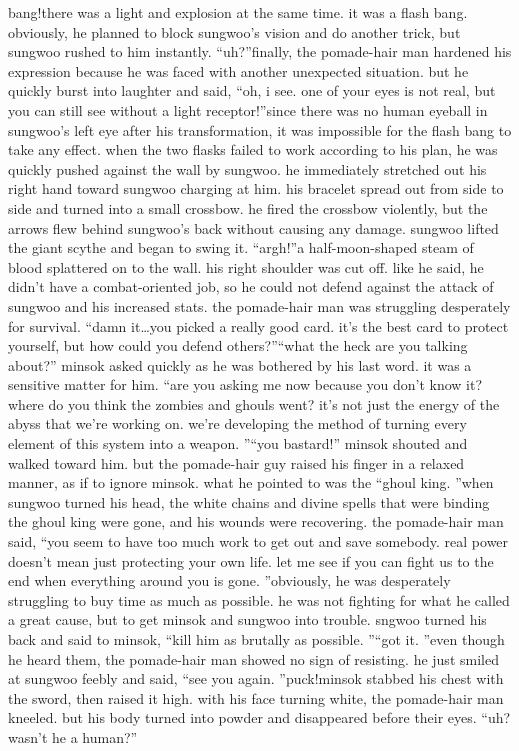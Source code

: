 bang!there was a light and explosion at the same time.
 it was a flash bang.
 obviously, he planned to block sungwoo’s vision and do another trick, but sungwoo rushed to him instantly.
“uh?”finally, the pomade-hair man hardened his expression because he was faced with another unexpected situation.
 but he quickly burst into laughter and said, “oh, i see.
 one of your eyes is not real, but you can still see without a light receptor!”since there was no human eyeball in sungwoo’s left eye after his transformation, it was impossible for the flash bang to take any effect.
when the two flasks failed to work according to his plan, he was quickly pushed against the wall by sungwoo.
 he immediately stretched out his right hand toward sungwoo charging at him.
 his bracelet spread out from side to side and turned into a small crossbow.
 he fired the crossbow violently, but the arrows flew behind sungwoo’s back without causing any damage.
 sungwoo lifted the giant scythe and began to swing it.
“argh!”a half-moon-shaped steam of blood splattered on to the wall.
 his right shoulder was cut off.
like he said, he didn’t have a combat-oriented job, so he could not defend against the attack of sungwoo and his increased stats.
 the pomade-hair man was struggling desperately for survival.
“damn it…you picked a really good card.
 it’s the best card to protect yourself, but how could you defend others?”“what the heck are you talking about?” minsok asked quickly as he was bothered by his last word.
 it was a sensitive matter for him.
“are you asking me now because you don’t know it? where do you think the zombies and ghouls went? it’s not just the energy of the abyss that we’re working on.
 we’re developing the method of turning every element of this system into a weapon.
”“you bastard!” minsok shouted and walked toward him.
but the pomade-hair guy raised his finger in a relaxed manner, as if to ignore minsok.
what he pointed to was the “ghoul king.
”when sungwoo turned his head, the white chains and divine spells that were binding the ghoul king were gone, and his wounds were recovering.
the pomade-hair man said, “you seem to have too much work to get out and save somebody.
 real power doesn’t mean just protecting your own life.
 let me see if you can fight us to the end when everything around you is gone.
”obviously, he was desperately struggling to buy time as much as possible.
 he was not fighting for what he called a great cause, but to get minsok and sungwoo into trouble.
sngwoo turned his back and said to minsok, “kill him as brutally as possible.
”“got it.
”even though he heard them, the pomade-hair man showed no sign of resisting.
 he just smiled at sungwoo feebly and said, “see you again.
”puck!minsok stabbed his chest with the sword, then raised it high.
 with his face turning white, the pomade-hair man kneeled.
 but his body turned into powder and disappeared before their eyes.
“uh? wasn’t he a human?”

